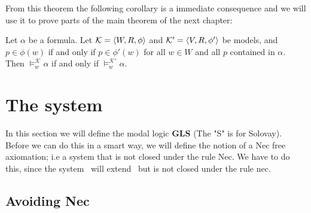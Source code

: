 \documentclass[../main.tex]{subfiles}
\begin{document}
From this theorem the following corollary is a immediate consequence and we
will use it to prove parts of the main theorem of the next chapter:
\begin{cor}\label{cor:conti}
	Let $\alpha$ be a formula. Let $\mathcal{K}=\langle W,R,\phi\rangle$ and
	$\mathcal{K}'=\langle V,R,\phi'\rangle$ be models, and $p\in\phi(w)$ if and
	only if $p\in\phi'(w)$ for all $w\in W$ and all $p$ contained in
	$\alpha$.
	Then $\vDash_w^\mathcal{K}\alpha$ if and only if
	$\vDash_w^{\mathcal{K}'}\alpha$.
\end{cor}

\section{The system }

In this section we will define the modal logic \textbf{GLS} (The "S" is for
Solovay). Before we can do
this in a smart way, we will define the notion of a Nec free axiomation; i.e a
system that is not closed under the rule Nec. We have to do this, since the
system \GLS\ will extend \GL\ but is not closed under the rule nec.

\subsection{Avoiding Nec}
\end{document}
